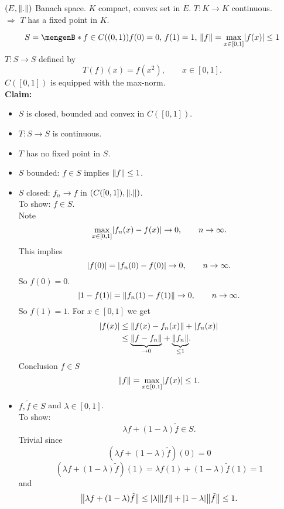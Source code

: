 \begin{theorem}
	$(E, \norm{.})$ Banach space. $K$ compact, convex set in $E$. $T: K \to K$ continuous. \\
	$\Rightarrow $ $T$ has a fixed point in $K$.
\end{theorem}
\begin{beispiel}
	\[
		S = \set[f \in C((0,1))]{f(0) = 0,\, f(1)=1,\, \norm{f} = \max\limits_{x \in [0,1]} \abs{f(x)} \leq 1}
	\]
	$T: S \to S$ defined by
	\[
		T(f)(x) = f(x^2), \qquad x \in [0,1].
	\]
	$C([0,1])$ is equipped with the max-norm. \\
	\textbf{Claim:} \text{    }     \begin{itemize}
		\item $S$ is closed, bounded and convex in $C([0,1])$.
		\item $T: S \to S$ is continuous.
		\item $T$ has no fixed point in $S$.
	\end{itemize}
	\begin{itemize}
		\item 
	$S$ bounded: $f \in S$ implies $\norm{f}\leq 1$. 
	\item $S$ closed: $f_n \to f$ in $(C([0,1]),\norm{.})$. \\
	To show: $f \in S$. \\
	Note \[
		\max_{x \in [0,1]}\lvert f_n(x)-f(x)\rvert \to 0, \qquad n \to \infty.
	\]
	This implies
	\[
		\lvert f(0)\rvert = \lvert f_n(0)-f(0)\rvert \to 0, \qquad n \to \infty.
	\]
	So $f(0)=0$.
	\[
		\abs{1-f(1)} = \norm{f_n(1)-f(1)} \to 0, \qquad n \to \infty.
	\]
	So $f(1)=1$. For $x \in [0,1]$ we get
	\begin{align*}
		\abs{f(x)} &\leq \norm{f(x)-f_n(x)} + \abs{f_n(x)} \\
		&\leq \underset{\to 0}{\underbrace{\norm{f-f_n}}} + \underset{\leq 1}{\underbrace{\norm{f_n}}}. 
	\end{align*}
	Conclusion $f \in S$
	\[
		\norm{f} = \max_{x \in [0,1]}\abs{f(x)} \leq 1.
	\]
	\item $f,\tilde f \in S$ and $\lambda \in [0,1]$. \\
	To show: 
	\[
		\lambda f + (1- \lambda) \tilde f \in S.
	\]
	Trivial since
	\[
		(\lambda f + (1-\lambda) \tilde f)(0) = 0 
	\]
	\[
		(\lambda f + (1- \lambda) \tilde f)(1) = \lambda f(1)+ (1- \lambda)\tilde f(1)= 1
	\]
	and	
	\[
		\norm{\lambda f + (1-\lambda) \tilde f} \leq \abs{\lambda} \norm{f} + \abs{1- \lambda} \norm{ \tilde f} \leq 1.
	\]
	\end{itemize}

\end{beispiel}
